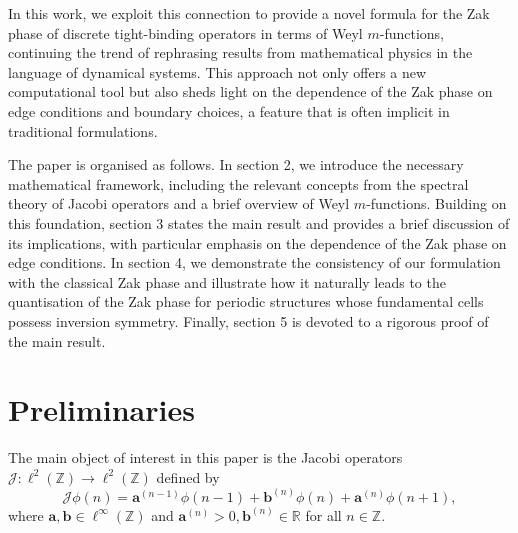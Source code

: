 \documentclass[a4paper,reqno,twoside]{amsart}
\numberwithin{equation}{section}
\theoremstyle{definition}
\newcommand{\bseq}[2]{{\bm{#1}^{(#2)}}}
\newcommand{\<}{\ensuremath \leq}
\renewcommand{\>}{\ensuremath \geq}
\begin{document}
In this work, we exploit this connection to provide a novel formula for the Zak phase of discrete tight-binding operators in terms of Weyl $m$-functions, continuing the trend \cite{ammari2025uniformhyperbolicitybandgapsedge,ammari2025topological,huang2025resonanceanalysisonedimensionalacoustic} of rephrasing results from mathematical physics in the language of dynamical systems. This approach not only offers a new computational tool but also sheds light on the dependence of the Zak phase on edge conditions and boundary choices, a feature that is often implicit in traditional formulations.

The paper is organised as follows. In section 2, we introduce the necessary mathematical framework, including the relevant concepts from the spectral theory of Jacobi operators and a brief overview of Weyl $m$-functions. Building on this foundation, section 3 states the main result and provides a brief discussion of its implications, with particular emphasis on the dependence of the Zak phase on edge conditions. In section 4, we demonstrate the consistency of our formulation with the classical Zak phase and illustrate how it naturally leads to the quantisation of the Zak phase for periodic structures whose fundamental cells possess inversion symmetry. Finally, section 5 is devoted to a rigorous proof of the main result.

\section{Preliminaries}\label{sec: preliminaries}

The main object of interest in this paper is the Jacobi operators $\mathcal{J}: \ell^2(\mathbb{Z})\rightarrow\ell^2(\mathbb{Z})$ defined by
\begin{equation*}
    \mathcal{J}\phi(n) = \bseq{a}{n-1}\phi(n-1) + \bseq{b}{n}\phi(n) + \bseq{a}{n}\phi(n +1),
\end{equation*}
where $\mathbf{a},  \mathbf{b} \in \ell^\infty(\mathbb{Z})$ and $\bseq{a}{n} >0, \bseq{b}{n} \in \mathbb{R}$ for all $n \in \mathbb{Z}$.  
\end{document}
